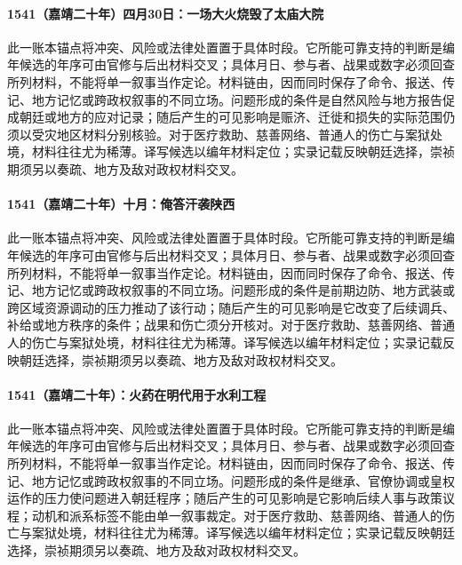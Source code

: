 \paragraph{1541（嘉靖二十年）四月30日：一场大火烧毁了太庙大院} 此一账本锚点将冲突、风险或法律处置置于具体时段。它所能可靠支持的判断是编年候选的年序可由官修与后出材料交叉；具体月日、参与者、战果或数字必须回查所列材料，不能将单一叙事当作定论。材料链由，因而同时保存了命令、报送、传记、地方记忆或跨政权叙事的不同立场。问题形成的条件是自然风险与地方报告促成朝廷或地方的应对记录；随后产生的可见影响是赈济、迁徙和损失的实际范围仍须以受灾地区材料分别核验。对于医疗救助、慈善网络、普通人的伤亡与案狱处境，材料往往尤为稀薄。译写候选以编年材料定位；实录记载反映朝廷选择，崇祯期须另以奏疏、地方及敌对政权材料交叉。

\paragraph{1541（嘉靖二十年）十月：俺答汗袭陕西} 此一账本锚点将冲突、风险或法律处置置于具体时段。它所能可靠支持的判断是编年候选的年序可由官修与后出材料交叉；具体月日、参与者、战果或数字必须回查所列材料，不能将单一叙事当作定论。材料链由，因而同时保存了命令、报送、传记、地方记忆或跨政权叙事的不同立场。问题形成的条件是前期边防、地方武装或跨区域资源调动的压力推动了该行动；随后产生的可见影响是它改变了后续调兵、补给或地方秩序的条件；战果和伤亡须分开核对。对于医疗救助、慈善网络、普通人的伤亡与案狱处境，材料往往尤为稀薄。译写候选以编年材料定位；实录记载反映朝廷选择，崇祯期须另以奏疏、地方及敌对政权材料交叉。

\paragraph{1541（嘉靖二十年）：火药在明代用于水利工程} 此一账本锚点将冲突、风险或法律处置置于具体时段。它所能可靠支持的判断是编年候选的年序可由官修与后出材料交叉；具体月日、参与者、战果或数字必须回查所列材料，不能将单一叙事当作定论。材料链由，因而同时保存了命令、报送、传记、地方记忆或跨政权叙事的不同立场。问题形成的条件是继承、官僚协调或皇权运作的压力使问题进入朝廷程序；随后产生的可见影响是它影响后续人事与政策议程；动机和派系标签不能由单一叙事裁定。对于医疗救助、慈善网络、普通人的伤亡与案狱处境，材料往往尤为稀薄。译写候选以编年材料定位；实录记载反映朝廷选择，崇祯期须另以奏疏、地方及敌对政权材料交叉。

